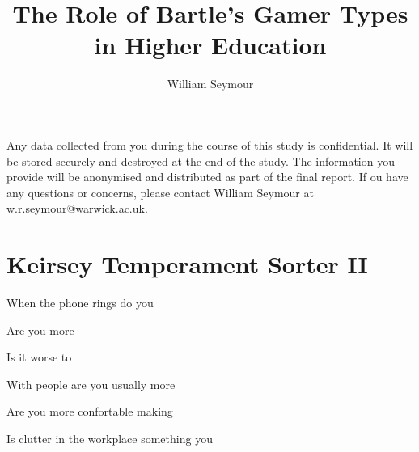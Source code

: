 \documentclass[english,pdf,pagemark,stamp,globalid=\candidateID,oneside]{sdaps}
\author{William Seymour}
\title{The Role of Bartle's Gamer Types in Higher Education}
\begin{document}
  \begin{questionnaire}
    \begin{info}
      Any data collected from you during the course of this study is confidential. It will be stored securely and destroyed at the end of the study. The information you provide will be anonymised and distributed as part of the final report. If ou have any questions or concerns, please contact William Seymour at w.r.seymour@warwick.ac.uk.
    \end{info}

    \section{Keirsey Temperament Sorter II}

\begin{multicols}{2}

\begin{choicequestion}[2]{When the phone rings do you}
\end{choicequestion}
    
\begin{choicequestion}[2]{Are you more}
\end{choicequestion}
    
\begin{choicequestion}[2]{Is it worse to}
    \end{choicequestion}

\begin{choicequestion}[2]{With people are you usually more}
\end{choicequestion}

\begin{choicequestion}[2]{Are you more confortable making}
\end{choicequestion}

\begin{choicequestion}[2]{Is clutter in the workplace something you}
\end{choicequestion}


\end{multicols}
\end{questionnaire}
\end{document}
